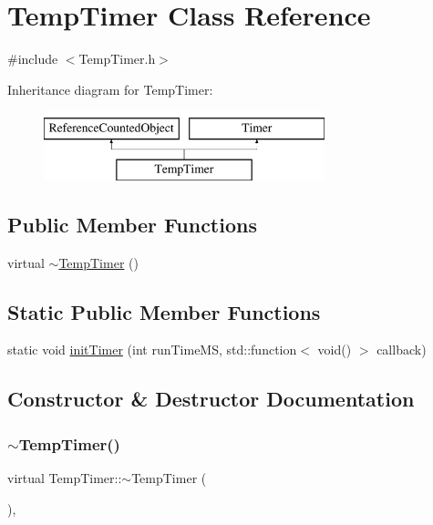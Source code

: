 \hypertarget{classTempTimer}{}\section{Temp\+Timer Class Reference}
\label{classTempTimer}


{\ttfamily \#include $<$Temp\+Timer.\+h$>$}

Inheritance diagram for Temp\+Timer\+:\begin{figure}[H]
\begin{center}
\leavevmode
\includegraphics[height=2.000000cm]{classTempTimer}
\end{center}
\end{figure}
\subsection*{Public Member Functions}
\begin{DoxyCompactItemize}
\item 
virtual \mbox{\hyperlink{classTempTimer_a23461d9cd9f27ecd20f7a8beb8d46282}{$\sim$\+Temp\+Timer}} ()
\end{DoxyCompactItemize}
\subsection*{Static Public Member Functions}
\begin{DoxyCompactItemize}
\item 
static void \mbox{\hyperlink{classTempTimer_a5db68af0dbd4edf0d9c66ff5286d72a4}{init\+Timer}} (int run\+Time\+MS, std\+::function$<$ void() $>$ callback)
\end{DoxyCompactItemize}


\subsection{Constructor \& Destructor Documentation}
\mbox{\label{classTempTimer_a23461d9cd9f27ecd20f7a8beb8d46282}} 
\subsubsection{\texorpdfstring{$\sim$\+Temp\+Timer()}{~TempTimer()}}
{\footnotesize\ttfamily virtual Temp\+Timer\+::$\sim$\+Temp\+Timer (\begin{DoxyParamCaption}{ }\end{DoxyParamCaption})\hspace{0.3cm}{\ttfamily [inline]}, {\ttfamily [virtual]}}



